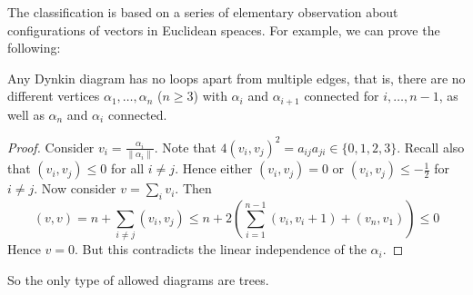 \documentclass[11pt, english]{article}
\begin{document}
The classification is based on a series of elementary observation about configurations of vectors in Euclidean speaces. For example, we can prove the following:

\begin{lemma}
Any Dynkin diagram has no loops apart from multiple edges, that is, there are no different vertices $\alpha_1, \ldots, \alpha_n$ ($n \geq 3$) with $\alpha_i$ and $\alpha_{i+1}$ connected for $i,\ldots,n-1$, as well as $\alpha_n$ and $\alpha_i$ connected.
\end{lemma}
\begin{proof}
Consider $v_i = \frac{\alpha_i}{\| \alpha_i \|}$. Note that $4(v_i,v_j)^2 = a_{ij}a_{ji} \in \{ 0,1,2,3 \}$. Recall also that $(v_i,v_j) \leq 0$ for all $i \neq j$. Hence either $(v_i,v_j)=0$ or $(v_i,v_j) \leq -\frac 12$ for $i \neq j$. Now consider $v = \sum_i v_i$. Then
$$
(v,v) = n + \sum_{i \neq j} (v_i,v_j) \leq n+ 2 \left( \sum_{i=1}^{n-1} (v_i,v_i+1) + (v_n,v_1) \right)  \leq 0
$$
Hence $v=0$. But this contradicts the linear independence of the $\alpha_i$.
\end{proof}

So the only type of allowed diagrams are trees. 
\end{document}
